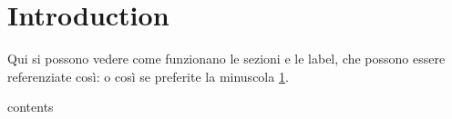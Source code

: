 
\chapter{Introduction}
\label{cap:introduction}

Qui si possono vedere come funzionano le sezioni e le label, che possono essere referenziate così:  o così se preferite la minuscola \cref{cap:introduction}.




contents
